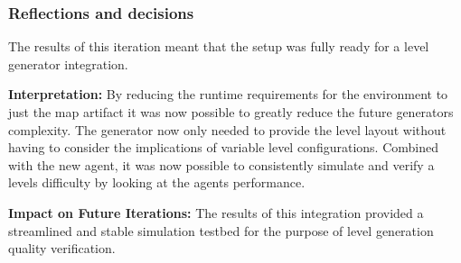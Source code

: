 \subsubsection{Reflections and decisions}
The results of this iteration meant that the setup was fully ready for a level generator integration.

\textbf{Interpretation:} By reducing the runtime requirements for the environment to just the map artifact it was now possible to greatly reduce the future
generators complexity. The generator now only needed to provide the level layout without having to consider the implications of variable level configurations.
Combined with the new agent, it was now possible to consistently simulate and verify a levels difficulty by looking at the agents performance.

\textbf{Impact on Future Iterations:} The results of this integration provided a streamlined and stable simulation testbed for the purpose of level generation quality verification.
